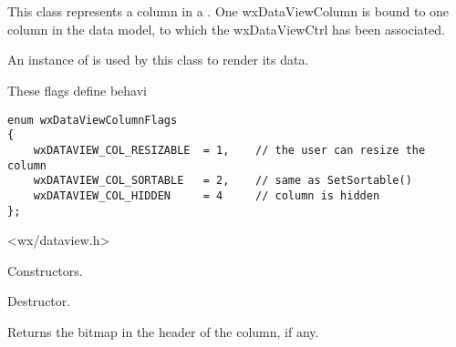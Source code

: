 
\section{}\label{wxdataviewcolumn}


This class represents a column in a .
One wxDataViewColumn is bound to one column in the data model,
to which the wxDataViewCtrl has been associated. 

An instance of  is used by
this class to render its data.


These flags define behavi

{\small
\begin{verbatim}
enum wxDataViewColumnFlags
{
    wxDATAVIEW_COL_RESIZABLE  = 1,    // the user can resize the column
    wxDATAVIEW_COL_SORTABLE   = 2,    // same as SetSortable()
    wxDATAVIEW_COL_HIDDEN     = 4     // column is hidden
};
\end{verbatim}
}




<wx/dataview.h>


\label{wxdataviewcolumnwxdataviewcolumn}




Constructors.


\label{wxdataviewcolumndtor}


Destructor.

\label{wxdataviewcolumngetbitmap}


Returns the bitmap in the header of the column, if any.

